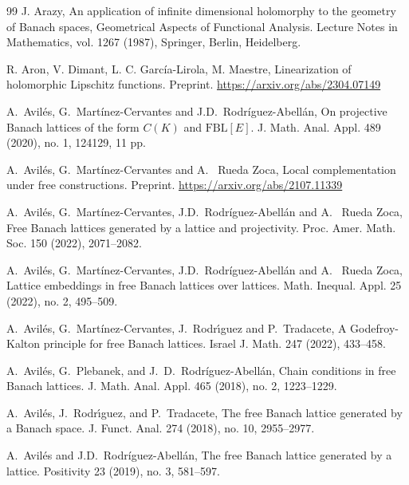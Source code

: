\documentclass[12pt,leqno]{amsart}
\numberwithin{equation}{section} %
\theoremstyle{definition}
\numberwithin{equation}{section}
\newcommand{\fbl}{\mathrm{FBL}}
\begin{document}
\begin{thebibliography}{99}
J. Arazy, An application of infinite dimensional holomorphy to the geometry of Banach spaces, Geometrical Aspects of Functional Analysis. Lecture Notes in Mathematics, vol. 1267 (1987), Springer, Berlin, Heidelberg. 

R. Aron, V. Dimant, L. C. Garc\'ia-Lirola, M. Maestre, Linearization of holomorphic Lipschitz functions. Preprint. \url{https://arxiv.org/abs/2304.07149}





 A.~Avil\'es, G.~Mart\'{i}nez-Cervantes and J.D.~Rodr\'iguez-Abell\'an, On projective Banach lattices of the form $C(K)$ and $\fbl[E]$.  J. Math. Anal. Appl. 489 (2020), no. 1, 124129, 11 pp.

A.~Avil\'es, G.~Mart\'{i}nez-Cervantes and A.~ Rueda Zoca, Local complementation under free constructions. Preprint. \url{https://arxiv.org/abs/2107.11339}

A.~Avil\'es, G.~Mart\'{i}nez-Cervantes, J.D.~Rodr\'iguez-Abell\'an and A.~ Rueda Zoca, Free Banach lattices generated by a lattice and projectivity. Proc. Amer. Math. Soc. 150 (2022), 2071--2082.

A.~Avil\'es, G.~Mart\'{i}nez-Cervantes, J.D.~Rodr\'iguez-Abell\'an and A.~ Rueda Zoca, Lattice embeddings in free Banach lattices over lattices. Math. Inequal. Appl. 25 (2022), no. 2, 495--509.

A.~Avil\'es, G.~Mart\'{i}nez-Cervantes, J.~Rodr\'{\i}guez and P.~Tradacete,
 A Godefroy-Kalton principle for free Banach lattices. Israel J. Math. 247 (2022), 433--458.

A.~Avil\'es, G.~Plebanek, and J.~D.~Rodr\'iguez-Abell\'an, Chain conditions in free Banach lattices. J. Math. Anal. Appl. 465 (2018), no. 2, 1223--1229.

A.~Avil\'es, J.~Rodr\'{\i}guez, and P.~Tradacete,
 The free Banach lattice generated by a Banach space. J. Funct. Anal. 274 (2018), no. 10, 2955--2977.

  A.~Avil\'es and J.D.~Rodr\'iguez-Abell\'an, The free Banach lattice generated by a lattice.  Positivity 23 (2019), no. 3, 581--597.
  

\end{thebibliography}
\end{document}
